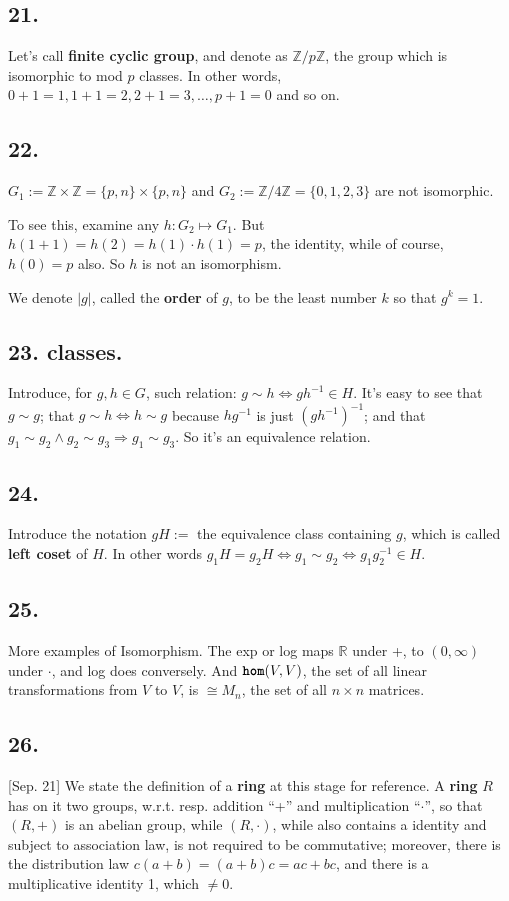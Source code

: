 \documentclass[12pt]{article}
\newcommand\oo\infty%
\newcommand\M\cdot%
\newcommand\X\times%
\newcommand\Mp\mapsto%
\newcommand{\Eq}{\Leftrightarrow}%
\newcommand{\Ip}{\Rightarrow} %
\newcommand{\BF}[1]{ \mathbb{#1} }%
\newcommand{\Ss}[1]{\textsf{\textbf{#1}}}%
\newcommand{\Tw}[1]{\texttt{\textbf{#1}}}%
\begin{document}
\subsection*{21.} Let's call \Ss{finite cyclic group}, and denote as \(\BF Z /p \BF Z\), the group which is isomorphic to mod \(p\) classes. 
In other words, \(0+1=1, 1+1=2, 2+1=3,\dotsc,p+1=0\) and so on. 

\subsection*{22.} \(G_1 := \BF Z \X \BF Z = \{p,n\} \X \{p,n\}\) and \(G_2 := \BF Z /4 \BF Z = \{0,1,2,3\}\) are not isomorphic. \par
To see this, examine any \(h: G_2 \Mp G_1\). 
But \( h(1 + 1) = h(2) = h(1) \M h(1) = p \), the identity, while of course, \(h(0) = p\) also. 
So \(h\) is not an isomorphism. \par
We denote \(|g|\), called the \Ss{order} of \(g\), to be the least number \(k\) so that \(g^k=1\). 

\subsection*{23. classes.} Introduce, for \(g,h \in G\), such relation: \( g \sim h \Eq gh^{-1} \in H \). 
It's easy to see that \(g \sim g\); 
that \(g \sim h \Eq h \sim g\) because \(hg^{-1}\) is just \((gh^{-1})^{-1}\); 
and that \(g_1 \sim g_2 \land g_2 \sim g_3 \Ip g_1 \sim g_3 \). 
So it's an equivalence relation. 

\subsection*{24.} Introduce the notation \(gH :=\) the equivalence class containing \(g\), 
which is called \Ss{left coset} of \(H\). 
In other words \( g_1 H = g_2 H \Eq g_1 \sim g_2 \Eq g_1 g_2^{-1} \in H\). 

\subsection*{25.} More examples of Isomorphism. The exp or log maps \(\BF R\) under +, to \((0,\oo)\) under \(\M\), and log does conversely. 
And \(\Tw{hom}(V,V)\), the set of all linear transformations from \(V\) to \(V\), is \(\cong M_n\), the set of all \(n \X n\) matrices. 

\subsection*{26.} [Sep. 21] We state the definition of a \Ss{ring} at this stage for reference. 
A \Ss{ring} \(R\) has on it two groups, w.r.t. resp. addition ``+'' and multiplication ``\(\M\)'', 
so that \((R, +)\) is an abelian group, while \((R, \M)\), while also contains a identity and subject to association law, is not required to be commutative; 
moreover, there is the distribution law \( c(a+b) = (a+b)c = ac + bc \), and there is a multiplicative identity 1, which \(\neq 0\). 
\end{document}
